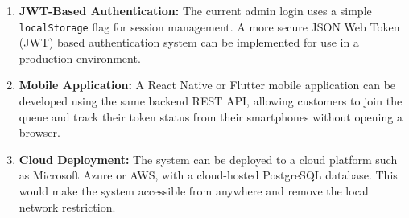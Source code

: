\begin{enumerate}
    \item \textbf{JWT-Based Authentication:} The current admin login uses a simple \texttt{localStorage} flag for session management. A more secure JSON Web Token (JWT) based authentication system can be implemented for use in a production environment.

    \item \textbf{Mobile Application:} A React Native or Flutter mobile application can be developed using the same backend REST API, allowing customers to join the queue and track their token status from their smartphones without opening a browser.

    \item \textbf{Cloud Deployment:} The system can be deployed to a cloud platform such as Microsoft Azure or AWS, with a cloud-hosted PostgreSQL database. This would make the system accessible from anywhere and remove the local network restriction.
\end{enumerate}

